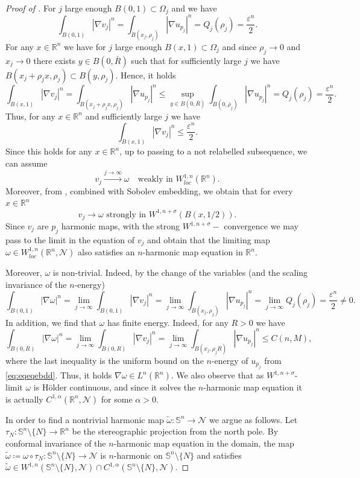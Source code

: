 \documentclass[12pt]{amsart}
\def\eps{\varepsilon}
\def\n{{\mathcal M}}
\def\n{{\mathcal{M}}}
\def\n{{\mathcal N}}
\def\S{{\mathbb S}}
\newcommand{\R}{\mathbb{R}}
\numberwithin{theorem}{section} \numberwithin{equation}{section}
\begin{document}
\begin{proof}[Proof of ]
For $j$ large enough $B (0,1)\subset \Omega_j$ and we have
\begin{equation}\label{eq:nontrivialenergy}
 \int_{B (0,1)} |\nabla v_j|^{n} = \int_{B (x_j,\rho_j)} |\nabla u_{p_j}|^{n} =  Q_j(\rho_j) = \frac{\eps^{n}}{2}.
\end{equation}
For any $x\in\R^n$ we have for $j$ large enough $B (x,1)\subset \Omega_j$ and since $\rho_j\to 0$ and $x_j \to 0$ there exists $y\in B (0,\bar{R})$ such that for sufficiently large $j$ we have $B (x_j+\rho_j x,\rho_j) \subset B (y,\rho_j)$. Hence, it holds
\[
 \int_{B (x,1)} |\nabla v_j|^{n} = \int_{B (x_j+\rho_j x,\rho_j)} |\nabla u_{p_j}|^{n} \le  \sup_{y\in B (0,\bar{R})}\int_{B (0,\bar{\rho}_j)} |\nabla u_{p_j}|^{n} = Q_j(\rho_j) =  \frac{\eps^{n}}{2}.
\]
Thus, for any $x\in \R^n$ and sufficiently large $j$ we have
\[
 \int_{B (x,1)} |\nabla v_j|^{n} \le \frac{\eps^{n}}{2}.
\]
Since this holds for any $x \in \R^n$, up to passing to a not relabelled subsequence, we can assume
\[
 v_j \xrightarrow{j \to \infty} \omega \quad \text{weakly in $W^{1,n}_{loc}(\R^n)$}.
\]
Moreover, from , combined with Sobolev embedding, we obtain that for every $x\in \R^n$
\[
 v_j \to \omega \text{ strongly in } W^{1,n+\sigma}\left(B (x,1/2 )\right).
\]
Since $v_j$ are $p_j$ harmonic maps, with the strong $W^{1, n+\sigma}-$ convergence we may pass to the limit in the equation of $v_j$ and obtain that the limiting map $\omega \in W^{1,n}_{loc}(\R^n,\n)$ also satisfies an $n$-harmonic map equation in $\R^n$.

Moreover, $\omega$ is non-trivial. Indeed, by the change of the variables (and the scaling invariance of the $n$-energy)
\[
\int_{B (0,1)}|\nabla \omega|^n = \lim_{j\to \infty} \int_{B (0,1)} |\nabla v_j|^n = \lim_{j\to \infty}\int_{B (x_j,\rho_j)} |\nabla u_{p_j}|^n = \lim_{j\to \infty} Q_j(\rho_j) = 
\frac{\eps^n}{2} \neq 0.
\]
In addition, we find that $\omega$ has finite energy. Indeed, for any $R>0$ we have
\[
 \int_{B (0,R)} |\nabla \omega|^n = \lim_{j\to \infty} \int_{B (0,R)} |\nabla v_j|^n = \lim_{j\to\infty} \int_{B (x_j,\rho_j R)} |\nabla u_{p_j}|^n \le C(n,M),
\]
where the last inequality is the uniform bound on the $n$-energy of $u_{p_j}$ from \eqref{eq:eqeqebdd}. Thus, it holds $\nabla \omega\in L^n(\R^n)$.
We also observe that as $W^{1,n+\sigma}$-limit $\omega$ is H\"{o}lder continuous, and since it solves the $n$-harmonic map 
equation it is actually $C^{1,\alpha}(\R^n,\n)$ for some $\alpha > 0$.

In order to find a nontrivial harmonic map $\tilde{\omega}\colon \S^n \to \n$ we argue as follows. Let $\tau_N\colon \S^n\setminus\{N\}\to \R^n$ be the stereographic projection from the north pole.
By conformal invariance of the $n$-harmonic map equation in the domain, the map $\tilde\omega \coloneqq \omega\circ \tau_N \colon \S^n\setminus\{N\}\to \n$
is $n$-harmonic on $\S^n\setminus\{N\}$ and satisfies
$\tilde\omega\in W^{1,n}(\S^n\setminus\{N\},\n)\cap C^{1,\alpha}(\S^n\setminus\{N\},\n)$.


\end{proof}
\end{document}
